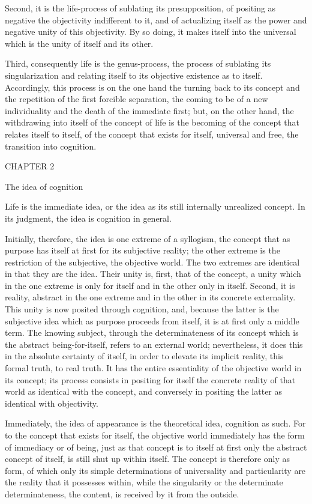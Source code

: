 Second, it is the life-process of sublating its presupposition,
of positing as negative the objectivity indifferent to it,
and of actualizing itself as the power
and negative unity of this objectivity.
By so doing, it makes itself into the universal
which is the unity of itself and its other.

Third, consequently life is the genus-process,
the process of sublating its singularization
and relating itself to its objective existence
as to itself.
Accordingly, this process is
on the one hand the turning back to its concept
and the repetition of the first forcible separation,
the coming to be of a new individuality
and the death of the immediate first;
but, on the other hand, the withdrawing into itself
of the concept of life is the becoming of
the concept that relates itself to itself,
of the concept that exists for itself,
universal and free, the transition into cognition.

CHAPTER 2

The idea of cognition

Life is the immediate idea, or the idea as
its still internally unrealized concept.
In its judgment, the idea is cognition in general.

Initially, therefore, the idea is one extreme of a syllogism,
the concept that as purpose has itself
at first for its subjective reality;
the other extreme is the restriction
of the subjective, the objective world.
The two extremes are identical in that they are the idea.
Their unity is, first, that of the concept,
a unity which in the one extreme is only for itself
and in the other only in itself.
Second, it is reality, abstract in the one extreme
and in the other in its concrete externality.
This unity is now posited through cognition,
and, because the latter is the subjective idea
which as purpose proceeds from itself,
it is at first only a middle term.
The knowing subject, through the
determinateness of its concept
which is the abstract being-for-itself,
refers to an external world;
nevertheless, it does this in
the absolute certainty of itself,
in order to elevate its implicit reality,
this formal truth, to real truth.
It has the entire essentiality of
the objective world in its concept;
its process consists in positing for itself
the concrete reality of that world
as identical with the concept,
and conversely in positing the latter
as identical with objectivity.

Immediately, the idea of appearance is
the theoretical idea, cognition as such.
For to the concept that exists for itself,
the objective world immediately has
the form of immediacy or of being,
just as that concept is to itself
at first only the abstract concept of itself,
is still shut up within itself.
The concept is therefore only as form,
of which only its simple determinations
of universality and particularity are
the reality that it possesses within,
while the singularity or the determinate determinateness,
the content, is received by it from the outside.

